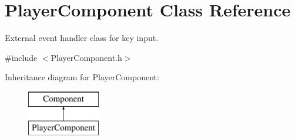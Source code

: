 \hypertarget{class_player_component}{\section{Player\+Component Class Reference}
\label{class_player_component}
}


External event handler class for key input.  




{\ttfamily \#include $<$Player\+Component.\+h$>$}

Inheritance diagram for Player\+Component\+:\begin{figure}[H]
\begin{center}
\leavevmode
\includegraphics[height=2.000000cm]{class_player_component}
\end{center}
\end{figure}
